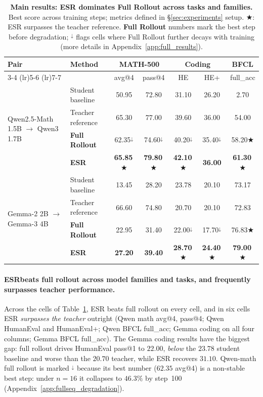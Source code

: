 \documentclass{article}
\newcommand{\method}{ESR}
\newcommand{\Method}{ESR}
\newcommand{\beatsteacher}{\textcolor{red!85!black}{$\bigstar$}}
\begin{document}
\begin{table}[t]
\centering
\caption{\textbf{Main results: \method{} dominates \textbf{Full Rollout} across tasks and families.} Best score across training steps; metrics defined in \S\ref{sec:experiments} setup. \beatsteacher: \method{} surpasses the teacher reference. \textbf{Full Rollout} numbers mark the best step before degradation; $^{\downarrow}$ flags cells where Full Rollout further decays with training (more details in Appendix~\ref{app:full_results}). }
\label{tab:main_results}
\footnotesize
\begin{tabular}{ll cc cc c}
\toprule
\textbf{Pair} & \textbf{Method} & \multicolumn{2}{c}{\textbf{MATH-500}} & \multicolumn{2}{c}{\textbf{Coding}} & \textbf{BFCL} \\
 \cmidrule(lr){3-4} \cmidrule(lr){5-6} \cmidrule(lr){7-7}
 & & avg@4 & pass@4 & HE & HE+ & full\_acc \\
\midrule
\multirow{4}{*}{Qwen2.5-Math 1.5B $\to$ Qwen3 1.7B} & Student baseline & 50.95 & 72.80 & 31.10 & 26.20 & 2.70 \\
 & Teacher reference & 65.30 & 77.00 & 39.60 & 36.00 & 54.00 \\
 & \textbf{Full Rollout} & 62.35$^{\downarrow}$ & 74.60$^{\downarrow}$ & 40.20$^{\downarrow}$ & 35.40$^{\downarrow}$ & 58.20\beatsteacher \\
 & \textbf{\Method{}} & \textbf{65.85}\,\beatsteacher & \textbf{79.80}\,\beatsteacher & \textbf{42.10}\,\beatsteacher & \textbf{36.00} & \textbf{61.30}\,\beatsteacher \\
\midrule
\multirow{4}{*}{Gemma-2 2B $\to$ Gemma-3 4B} & Student baseline & 13.45 & 28.20 & 23.78 & 20.10 & 73.17 \\
 & Teacher reference & 66.60 & 74.80 & 20.70 & 20.10 & 72.83 \\
 & \textbf{Full Rollout} & 22.95 & 31.40 & 22.00$^{\downarrow}$ & 17.70$^{\downarrow}$ & 76.83\beatsteacher \\
 & \textbf{\Method{}} & \textbf{27.20} & \textbf{39.40} & \textbf{28.70}\,\beatsteacher & \textbf{24.40}\,\beatsteacher & \textbf{79.00}\,\beatsteacher \\
\bottomrule
\end{tabular}
\end{table}

\paragraph{\boldmath\method beats full rollout across model families and tasks, and frequently surpasses teacher performance.} Across the cells of Table~\ref{tab:main_results}, \method{} beats full rollout on every cell, and in six cells \method{} \emph{surpasses the teacher} outright (Qwen math avg@4, pass@4; Qwen HumanEval and HumanEval+; Qwen BFCL full\_acc; Gemma coding on all four columns; Gemma BFCL full\_acc). The Gemma coding results have the biggest gap: full rollout drives HumanEval pass@1 to $22.00$, \emph{below} the $23.78$ student baseline and worse than the $20.70$ teacher, while \method{} recovers $31.10$. Qwen-math full rollout is marked $^{\downarrow}$ because its best number ($62.35$ avg@4) is a non-stable best step: under $n{=}16$ it collapses to $46.3\%$ by step~100 (Appendix~\ref{app:fullseq_degradation}).
\end{document}
